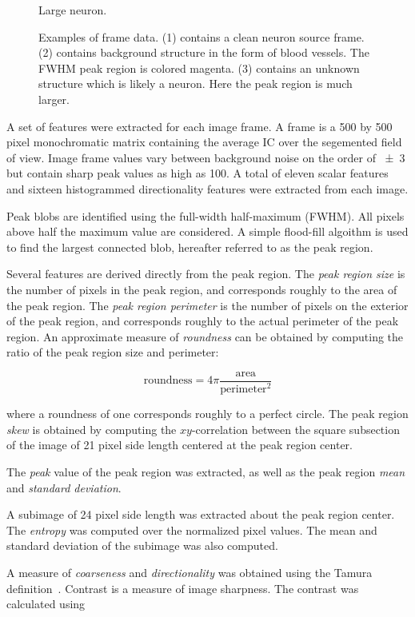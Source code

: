 \documentclass[10pt]{article}
\begin{document}
\begin{figure}[h]
\begin{minipage}{.33\textwidth}
      \caption{\footnotesize Large neuron. }
      \label{fig:frame3}
    \end{minipage}
    \caption{Examples of frame data. (1) contains a clean neuron source frame. (2) contains background structure in the form of blood vessels. The FWHM peak region is colored magenta. (3) contains an unknown structure which is likely a neuron. Here the peak region is much larger. }
\end{figure}

A set of features were extracted for each image frame.
A frame is a \num{500} by \num{500} pixel monochromatic matrix containing the average IC over the segemented field of view. 
Image frame values vary between background noise on the order of \num{+-3} but contain sharp peak values as high as \num{100}.
A total of eleven scalar features and sixteen histogrammed directionality features were extracted from each image.

Peak blobs are identified using the full-width half-maximum (FWHM). 
All pixels above half the maximum value are considered.
A simple flood-fill algoithm is used to find the largest connected blob, hereafter referred to as the peak region.

Several features are derived directly from the peak region.
The \emph{peak region size} is the number of pixels in the peak region, and corresponds roughly to the area of the peak region.
The \emph{peak region perimeter} is the number of pixels on the exterior of the peak region, and corresponds roughly to the actual perimeter of the peak region. 
An approximate measure of \emph{roundness} can be obtained by computing the ratio of the peak region size and perimeter:

$$
\text{roundness} = 4\pi \frac{\text{area}}{\text{perimeter}^2}
$$

\noindent
where a roundness of one corresponds roughly to a perfect circle.
The peak region \emph{skew} is obtained by computing the $xy$-correlation between the square subsection of the image of \num{21} pixel side length centered at the peak region center.

The \emph{peak} value of the peak region was extracted, as well as the peak region \emph{mean} and \emph{standard deviation}.

A subimage of \num{24} pixel side length was extracted about the peak region center.
The \emph{entropy} was computed over the normalized pixel values.
The mean and standard deviation of the subimage was also computed.

A measure of \emph{coarseness} and \emph{directionality} was obtained using the Tamura definition~\cite{Tamura1978}.
Contrast is a measure of image sharpness. 
The contrast was calculated using
\end{document}
